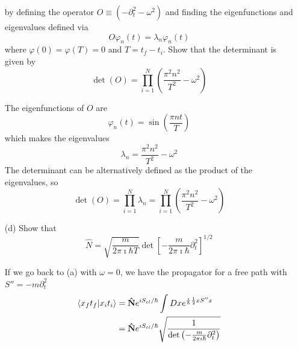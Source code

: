 \documentclass[a4paper,twoside]{article}
\begin{document}
\begin{itemize}
\begin{equation}
        \end{equation}
        by defining the operator $ O \equiv (-\partial_t^2 - \omega^2) $ and finding the eigenfunctions and eigenvalues defined via
        \begin{equation}
            O \varphi_n(t) = \lambda_n \varphi_n(t)
        \end{equation}
        where $ \varphi(0) = \varphi(T) = 0 $ and $ T = t_f - t_i $. Show that the determinant is given by
        \begin{equation}
            \det(O) = \prod_{i=1}^{N} \left( \frac{\pi^2 n^2}{T^2} - \omega^2 \right)
        \end{equation}
        \begin{problem}
            The eigenfunctions of $ O $ are
            \begin{equation}
                \varphi_n(t) = \sin\left( \frac{\pi n t}{T} \right)
            \end{equation}
            which makes the eigenvalues
            \begin{equation}
                \lambda_n = \frac{\pi^2 n^2}{T^2} - \omega^2
            \end{equation}
            The determinant can be alternatively defined as the product of the eigenvalues, so
            \begin{equation}
                \det(O) = \prod_{i=1}^{N} \lambda_n = \prod_{i=1}^{N} \left( \frac{\pi^2n^2}{T^2} - \omega^2 \right)
            \end{equation}
        \end{problem}
    \item[(d)] Show that
        \begin{equation}
            \hat{N} = \sqrt{\frac{m}{2 \pi \imath \hbar T}} \det\left[ - \frac{m}{2 \pi \imath \hbar} \partial_t^2 \right]^{1/2}
        \end{equation}
        \begin{problem}
            If we go back to (a) with $ \omega = 0 $, we have the propagator for a free path with $ S'' = - m \partial_t^2 $
            \begin{align}
                \bra{x_f t_f}\ket{x_i t_i} &= \vu{N} e^{\imath S_{cl} / \hbar} \int Dx e^{\frac{\imath}{\hbar} \frac{1}{2} x S'' x} \\
                &= \vu{N} e^{\imath S_{cl} / \hbar} \sqrt{\frac{1}{\det\left( - \frac{m}{2 \pi \imath \hbar} \partial_t^2 \right)}}
            \end{align}

\end{problem}
\end{itemize}
\end{document}
